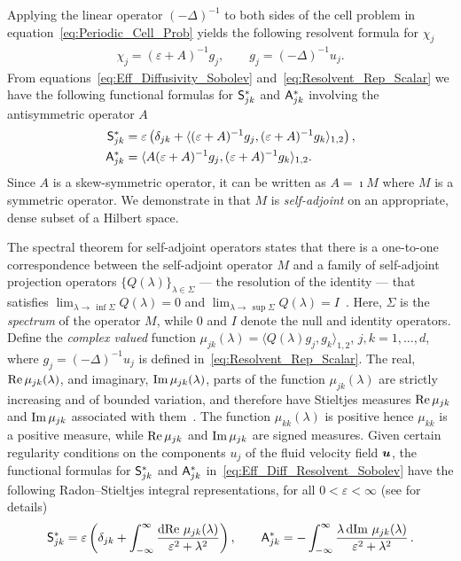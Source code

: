 \documentclass[amsa]{ipart}
\begin{document}
Applying the linear operator $(-\Delta)^{-1}$ to both sides of the cell
problem in equation~\eqref{eq:Periodic_Cell_Prob} yields the following
resolvent formula for $\chi_j$ 
%
\begin{align}\label{eq:Resolvent_Rep_Scalar}
  \chi_j=(\varepsilon+A)^{-1}g_j, \qquad 
  g_j=(-\Delta)^{-1}u_j.
\end{align}
%
From equations~\eqref{eq:Eff_Diffusivity_Sobolev}
and~\eqref{eq:Resolvent_Rep_Scalar} we have the following functional
formulas for $\mathsf{S}^*_{jk}$ and $\mathsf{A}^*_{jk}$ involving the
antisymmetric operator $A$
%
\begin{align}\label{eq:Eff_Diff_Resolvent_Sobolev}
 \Sm^*_{jk}&=\varepsilon\left(\delta_{jk}
  +\langle(\varepsilon+A)^{-1}g_j,(\varepsilon+A)^{-1}g_k\rangle_{1,2}\right), 
  \\
 \Am^*_{jk}&=\langle A(\varepsilon+A)^{-1}g_j,(\varepsilon+A)^{-1}g_k\rangle_{1,2}.
 \notag
\end{align}
%
Since $A$ is a skew-symmetric operator, it can be written as $A=\imath M$
where $M$ is a symmetric operator. We demonstrate in
 that $M$ is \emph{self-adjoint} on an
appropriate, dense subset of a Hilbert space.



The spectral theorem for self-adjoint operators states that there is a
one-to-one correspondence between the self-adjoint operator $M$ and a
family of self-adjoint projection operators $\{Q(\lambda)\}_{\lambda\in\Sigma}$ --- the
resolution of the identity --- that satisfies
$\lim_{\lambda\to\,\inf{\Sigma}}Q(\lambda)=0$ and
$\lim_{\lambda\to\,\sup{\Sigma}}Q(\lambda)=I$~\cite{Stone:64}. Here, $\Sigma$ is the
\emph{spectrum} of the operator $M$, while $0$ and $I$ denote the null
and identity operators. Define the \emph{complex valued} function
$\mu_{jk}(\lambda)=\langle Q(\lambda)g_j,g_k\rangle_{1,2}$, $j,k=1,\ldots,d$, where  $g_j=(-\Delta)^{-1}u_j$ is defined
in~\eqref{eq:Resolvent_Rep_Scalar}. The real, $\mbox{Re}\,\mu_{jk}(\lambda)$, and
imaginary, $\mbox{Im}\,\mu_{jk}(\lambda)$, parts of the function $\mu_{jk}(\lambda)$ are
strictly increasing and of bounded variation, and therefore have
Stieltjes measures $\mbox{Re}\,\mu_{jk}$ and $\mbox{Im}\,\mu_{jk}$ associated with
them~\cite{Stone:64}. The function $\mu_{kk}(\lambda)$ is positive hence
$\mu_{kk}$ is a positive measure, while $\mbox{Re}\,\mu_{jk}$ and $\mbox{Im}\,\mu_{jk}$
are signed measures. Given certain regularity conditions on the
components $u_j$ of the fluid velocity field $\boldsymbol{u}$, the functional
formulas for $\mathsf{S}^*_{jk}$ and $\mathsf{A}^*_{jk}$
in~\eqref{eq:Eff_Diff_Resolvent_Sobolev} have the following
Radon--Stieltjes integral representations, for all $0<\varepsilon<\infty$ (see
 for details) 
%
\begin{align}\label{eq:Integral_Rep_kappa*}
  \Sm^*_{jk}=\varepsilon\left(\delta_{jk}+\int_{-\infty}^\infty\frac{\d\Real\,\mu_{jk}(\lambda)}{\varepsilon^2+\lambda^2}\right),
  \qquad
  \Am^*_{jk}=-\int_{-\infty}^\infty\frac{\lambda\,\d\Imag\,\mu_{jk}(\lambda)}{\varepsilon^2+\lambda^2}\,.         
\end{align}
%
\end{document}
